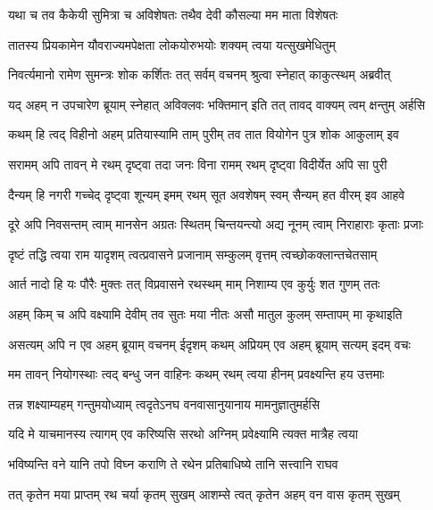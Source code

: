 \twolineshloka
{यथा च तव कैकेयी सुमित्रा च अविशेषतः}
{तथैव देवी कौसल्या मम माता विशेषतः} %

\twolineshloka
{तातस्य प्रियकामेन यौवराज्यमपेक्षता}
{लोकयोरुभयोः शक्यम् त्वया यत्सुखमेधितुम्} %

\twolineshloka
{निवर्त्यमानो रामेण सुमन्त्रः शोक कर्शितः}
{तत् सर्वम् वचनम् श्रुत्वा स्नेहात् काकुत्स्थम् अब्रवीत्} %

\twolineshloka
{यद् अहम् न उपचारेण ब्रूयाम् स्नेहात् अविक्लवः}
{भक्तिमान् इति तत् तावद् वाक्यम् त्वम् क्षन्तुम् अर्हसि} %

\twolineshloka
{कथम् हि त्वद् विहीनो अहम् प्रतियास्यामि ताम् पुरीम्}
{तव तात वियोगेन पुत्र शोक आकुलाम् इव} %

\twolineshloka
{सरामम् अपि तावन् मे रथम् दृष्ट्वा तदा जनः}
{विना रामम् रथम् दृष्ट्वा विदीर्येत अपि सा पुरी} %

\twolineshloka
{दैन्यम् हि नगरी गच्चेद् दृष्ट्वा शून्यम् इमम् रथम्}
{सूत अवशेषम् स्वम् सैन्यम् हत वीरम् इव आहवे} %

\twolineshloka
{दूरे अपि निवसन्तम् त्वाम् मानसेन अग्रतः स्थितम्}
{चिन्तयन्त्यो अद्य नूनम् त्वाम् निराहाराः कृताः प्रजाः} %

\twolineshloka
{दृष्टं तद्धि त्वया राम यादृशम् त्वत्प्रवासने}
{प्रजानाम् सम्कुलम् वृत्तम् त्वच्छोकक्लान्तचेतसाम्} %

\twolineshloka
{आर्त नादो हि यः पौरैः मुक्तः तत् विप्रवासने}
{रथस्थम् माम् निशाम्य एव कुर्युः शत गुणम् ततः} %

\twolineshloka
{अहम् किम् च अपि वक्ष्यामि देवीम् तव सुतः मया}
{नीतः असौ मातुल कुलम् सम्तापम् मा कृथाइति} %

\twolineshloka
{असत्यम् अपि न एव अहम् ब्रूयाम् वचनम् ईदृशम्}
{कथम् अप्रियम् एव अहम् ब्रूयाम् सत्यम् इदम् वचः} %

\twolineshloka
{मम तावन् नियोगस्थाः त्वद् बन्धु जन वाहिनः}
{कथम् रथम् त्वया हीनम् प्रवक्ष्यन्ति हय उत्तमाः} %

\twolineshloka
{तन्न शक्ष्याम्यहम् गन्तुमयोध्याम् त्वदृतेऽनघ}
{वनवासानुयानाय मामनुज्ञातुमर्हसि} %

\twolineshloka
{यदि मे याचमानस्य त्यागम् एव करिष्यसि}
{सरथो अग्निम् प्रवेक्ष्यामि त्यक्त मात्रैह त्वया} %

\twolineshloka
{भविष्यन्ति वने यानि तपो विघ्न कराणि ते}
{रथेन प्रतिबाधिष्ये तानि सत्त्वानि राघव} %

\twolineshloka
{तत् कृतेन मया प्राप्तम् रथ चर्या कृतम् सुखम्}
{आशम्से त्वत् कृतेन अहम् वन वास कृतम् सुखम्} %

